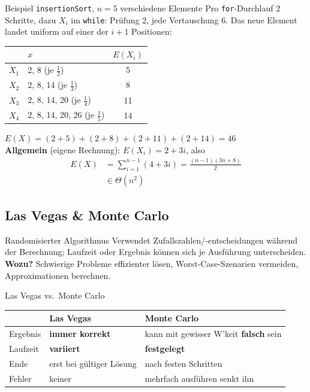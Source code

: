 \documentclass[a4paper, fontsize=7pt]{scrartcl}
\renewcommand*{\arraystretch}{1.5}  %
\begin{document}
\begin{subbox}{Beispiel \texttt{insertionSort}, $n = 5$ verschiedene Elemente}
Pro \texttt{for}-Durchlauf 2 Schritte, dazu $X_i$ im \texttt{while}: Prüfung 2,
jede Vertauschung 6. Das neue Element landet uniform auf einer der $i + 1$ Positionen:
\renewcommand*{\arraystretch}{1.15}
\begin{center}
\begin{tabular}{l|l|c}
 & $x$ & $E(X_i)$ \\ \hline
$X_1$ & 2, 8 (je $\frac{1}{2}$) & 5 \\
$X_2$ & 2, 8, 14 (je $\frac{1}{3}$) & 8 \\
$X_3$ & 2, 8, 14, 20 (je $\frac{1}{4}$) & 11 \\
$X_4$ & 2, 8, 14, 20, 26 (je $\frac{1}{5}$) & 14
\end{tabular}
\end{center}
$E(X) = (2 + 5) + (2 + 8) + (2 + 11) + (2 + 14) = \boxed{46}$\\[2pt]
\textbf{Allgemein} (eigene Rechnung): $E(X_i) = 2 + 3i$, also
\begin{align*}
E(X) &= \sum_{i=1}^{n-1} (4 + 3i) = \frac{(n - 1)(3n + 8)}{2}\\
&\in \Theta(n^2)
\end{align*}
\end{subbox}

\subsection{Las Vegas \& Monte Carlo}

\begin{mainbox}{Randomisierter Algorithmus}
Verwendet Zufallszahlen/-entscheidungen während der Berechnung; Laufzeit oder
Ergebnis können sich je Ausführung unterscheiden.\\
\textbf{Wozu?} Schwierige Probleme effizienter lösen, Worst-Case-Szenarien vermeiden,
Approximationen berechnen.
\end{mainbox}

\begin{mainbox}{Las Vegas vs.\ Monte Carlo}
\renewcommand*{\arraystretch}{1.2}
\begin{tabularx}{\linewidth}{@{}l|>{\raggedright\arraybackslash}X|>{\raggedright\arraybackslash}X@{}}
 & \textbf{Las Vegas} & \textbf{Monte Carlo} \\
\hline
Ergebnis & \textbf{immer korrekt} & kann mit gewisser W'keit \textbf{falsch} sein \\
Laufzeit & \textbf{variiert} & \textbf{festgelegt} \\
Ende & erst bei gültiger Lösung & nach festen Schritten \\
Fehler & keiner & mehrfach ausführen senkt ihn \\
\end{tabularx}
\end{mainbox}
\end{document}
